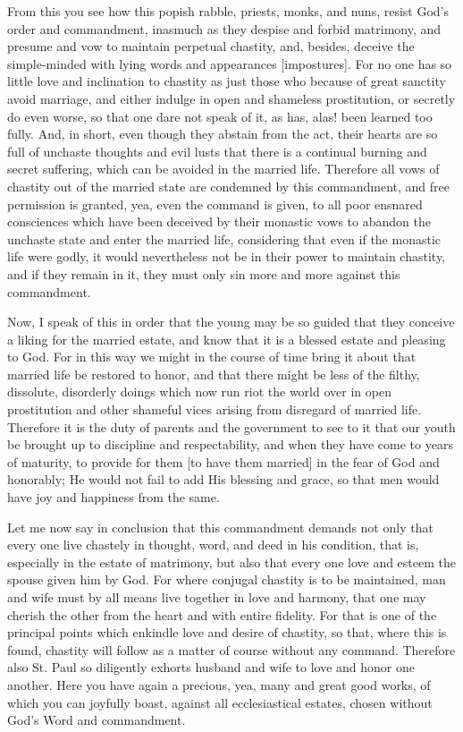 From this you see how this popish rabble, priests, monks, and nuns,
resist God's order and commandment, inasmuch as they despise and forbid
matrimony, and presume and vow to maintain perpetual chastity, and,
besides, deceive the simple-minded with lying words and appearances
[impostures]. For no one has so little love and inclination to chastity
as just those who because of great sanctity avoid marriage, and either
indulge in open and shameless prostitution, or secretly do even worse,
so that one dare not speak of it, as has, alas! been learned too fully.
And, in short, even though they abstain from the act, their hearts are
so full of unchaste thoughts and evil lusts that there is a continual
burning and secret suffering, which can be avoided in the married life.
Therefore all vows of chastity out of the married state are condemned
by this commandment, and free permission is granted, yea, even the
command is given, to all poor ensnared consciences which have been
deceived by their monastic vows to abandon the unchaste state and enter
the married life, considering that even if the monastic life were
godly, it would nevertheless not be in their power to maintain
chastity, and if they remain in it, they must only sin more and more
against this commandment.

Now, I speak of this in order that the young may be so guided that they
conceive a liking for the married estate, and know that it is a blessed
estate and pleasing to God. For in this way we might in the course of
time bring it about that married life be restored to honor, and that
there might be less of the filthy, dissolute, disorderly doings which
now run riot the world over in open prostitution and other shameful
vices arising from disregard of married life. Therefore it is the duty
of parents and the government to see to it that our youth be brought up
to discipline and respectability, and when they have come to years of
maturity, to provide for them [to have them married] in the fear of God
and honorably; He would not fail to add His blessing and grace, so that
men would have joy and happiness from the same.

Let me now say in conclusion that this commandment demands not only
that every one live chastely in thought, word, and deed in his
condition, that is, especially in the estate of matrimony, but also
that every one love and esteem the spouse given him by God. For where
conjugal chastity is to be maintained, man and wife must by all means
live together in love and harmony, that one may cherish the other from
the heart and with entire fidelity. For that is one of the principal
points which enkindle love and desire of chastity, so that, where this
is found, chastity will follow as a matter of course without any
command. Therefore also St. Paul so diligently exhorts husband and wife
to love and honor one another. Here you have again a precious, yea,
many and great good works, of which you can joyfully boast, against all
ecclesiastical estates, chosen without God's Word and commandment.

